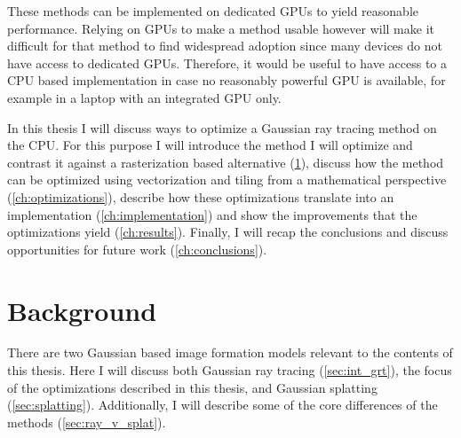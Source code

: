 \documentclass[a4paper, 11pt]{memoir}
\begin{document}
    These methods can be implemented on dedicated GPUs to yield reasonable performance. Relying on GPUs to make a method
    usable however will make it difficult for that method to find widespread adoption since many devices do not have
    access to dedicated GPUs. Therefore, it would be useful to have access to a CPU based implementation in case no reasonably
    powerful GPU is available, for example in a laptop with an integrated GPU only.

    In this thesis I will discuss ways to optimize a Gaussian ray tracing method on the CPU. For this purpose I will
    introduce the method I will optimize and contrast it against a rasterization based alternative (\ref{ch:background}),
    discuss how the method can be optimized using vectorization and tiling from a mathematical perspective
    (\ref{ch:optimizations}), describe how these optimizations translate into an implementation (\ref{ch:implementation})
    and show the improvements that the optimizations yield (\ref{ch:results}). Finally, I will recap the conclusions and
    discuss opportunities for future work (\ref{ch:conclusions}).


    \chapter{Background}
    \label{ch:background}
    There are two Gaussian based image formation models relevant to the contents of this thesis. Here I will discuss both
    Gaussian ray tracing (\ref{sec:int_grt}), the focus of the optimizations described in this thesis, and Gaussian
    splatting (\ref{sec:splatting}). Additionally, I will describe some of the core differences of the methods (\ref{sec:ray_v_splat}).
\end{document}
